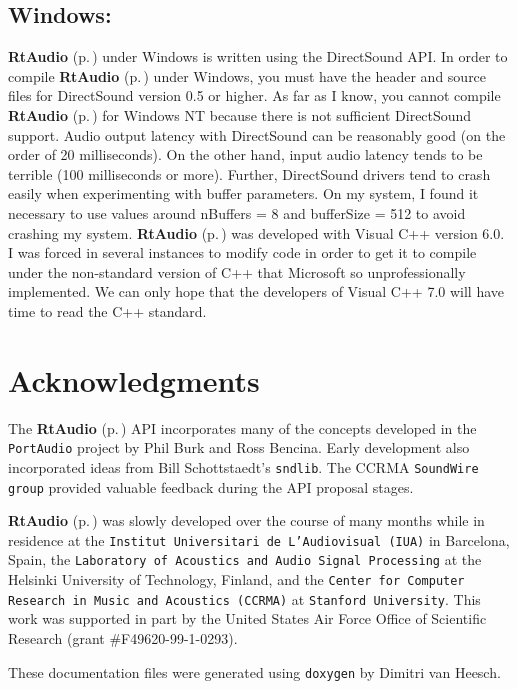 \subsection{Windows:}\label{windows}


{\bf Rt\-Audio} {\rm (p.\,\pageref{classRtAudio})} under Windows is written using the Direct\-Sound API. In order to compile {\bf Rt\-Audio} {\rm (p.\,\pageref{classRtAudio})} under Windows, you must have the header and source files for Direct\-Sound version 0.5 or higher. As far as I know, you cannot compile {\bf Rt\-Audio} {\rm (p.\,\pageref{classRtAudio})} for Windows NT because there is not sufficient Direct\-Sound support. Audio output latency with Direct\-Sound can be reasonably good (on the order of 20 milliseconds). On the other hand, input audio latency tends to be terrible (100 milliseconds or more). Further, Direct\-Sound drivers tend to crash easily when experimenting with buffer parameters. On my system, I found it necessary to use values around n\-Buffers = 8 and buffer\-Size = 512 to avoid crashing my system. {\bf Rt\-Audio} {\rm (p.\,\pageref{classRtAudio})} was developed with Visual C++ version 6.0. I was forced in several instances to modify code in order to get it to compile under the non-standard version of C++ that Microsoft so unprofessionally implemented. We can only hope that the developers of Visual C++ 7.0 will have time to read the C++ standard.

\section{Acknowledgments}\label{acknowledge}


The {\bf Rt\-Audio} {\rm (p.\,\pageref{classRtAudio})} API incorporates many of the concepts developed in the {\tt Port\-Audio} project by Phil Burk and Ross Bencina. Early development also incorporated ideas from Bill Schottstaedt's {\tt sndlib}. The CCRMA {\tt Sound\-Wire group} provided valuable feedback during the API proposal stages.

{\bf Rt\-Audio} {\rm (p.\,\pageref{classRtAudio})} was slowly developed over the course of many months while in residence at the {\tt Institut Universitari de L'Audiovisual (IUA)} in Barcelona, Spain, the {\tt Laboratory of Acoustics and Audio Signal Processing} at the Helsinki University of Technology, Finland, and the {\tt Center for Computer Research in Music and Acoustics (CCRMA)} at {\tt Stanford University}. This work was supported in part by the United States Air Force Office of Scientific Research (grant \#F49620-99-1-0293).

These documentation files were generated using {\tt doxygen} by Dimitri van Heesch.

